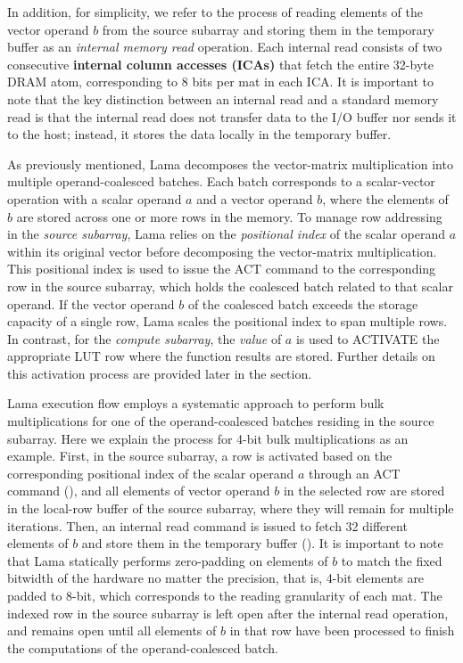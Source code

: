 In addition, for simplicity, we refer to the process of reading elements of the vector operand $b$ from the source subarray and storing them in the temporary buffer as an \textit{internal memory read} operation. Each internal read consists of two consecutive \textbf{internal column accesses (ICAs)} that fetch the entire 32-byte DRAM atom, corresponding to 8 bits per mat in each ICA. It is important to note that the key distinction between an internal read and a standard memory read is that the internal read does not transfer data to the I/O buffer nor sends it to the host; instead, it stores the data locally in the temporary buffer.


As previously mentioned, Lama decomposes the vector-matrix multiplication into multiple operand-coalesced batches. Each batch corresponds to a scalar-vector operation with a scalar operand $a$ and a vector operand $b$, where the elements of $b$ are stored across one or more rows in the memory. To manage row addressing in the \textit{source subarray}, Lama relies on the \textit{positional index} of the scalar operand $a$ within its original vector before decomposing the vector-matrix multiplication. This positional index is used to issue the ACT command to the corresponding row in the source subarray, which holds the coalesced batch related to that scalar operand. If the vector operand $b$ of the coalesced batch exceeds the storage capacity of a single row, Lama scales the positional index to span multiple rows. In contrast, for the \textit{compute subarray}, the \textit{value} of $a$ is used to ACTIVATE the appropriate LUT row where the function results are stored. Further details on this activation process are provided later in the section.


Lama execution flow employs a systematic approach to perform bulk multiplications for one of the operand-coalesced batches residing in the source subarray. Here we explain the process for 4-bit bulk multiplications as an example. First, in the source subarray, a row is activated based on the corresponding positional index of the scalar operand $a$ through an ACT command (), and all elements of vector operand $b$ in the selected row are stored in the local-row buffer of the source subarray, where they will remain for multiple iterations. Then, an internal read command is issued to fetch 32 different elements of $b$ and store them in the temporary buffer (). It is important to note that Lama statically performs zero-padding on elements of $b$ to match the fixed bitwidth of the hardware no matter the precision, that is, 4-bit elements are padded to 8-bit, which corresponds to the reading granularity of each mat. The indexed row in the source subarray is left open after the internal read operation, and remains open until all elements of $b$ in that row have been processed to finish the computations of the operand-coalesced batch.

